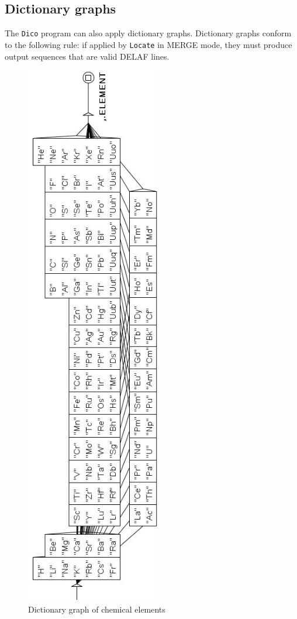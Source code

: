 \subsection{Dictionary graphs}
\label{section-dictionary-graphs}
The \verb+Dico+ program
can also apply dictionary graphs. Dictionary graphs conform to the following
rule: if applied by \verb+Locate+ in MERGE mode,
they must produce output sequences that are valid DELAF lines.

\begin{figure}[!p]
\begin{center}
\includegraphics[height=24cm]{resources/img/fig3-12.png}
\caption{Dictionary graph of chemical elements\label{elements}}
\end{center}
\end{figure}


